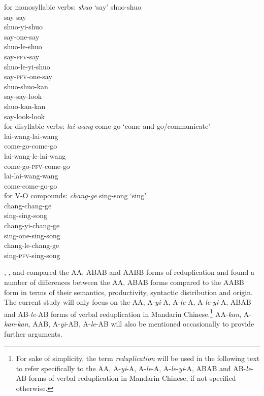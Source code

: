\documentclass[11pt,a4paper,fleqn,draft]{article}
\begin{document}
\ea\label{ex:redup-forms}
	\ea for monosyllabic verbs: \emph{shuo} `say'
		\ea \gll shuo-shuo\\
		say-say\\
		\ex \gll shuo-yi-shuo\\
		say-one-say\\
		\ex \gll shuo-le-shuo\\
		say-\textsc{pfv}-say\\
		\ex \gll shuo-le-yi-shuo\\
		say-\textsc{pfv}-one-say\\
		\ex \gll shuo-shuo-kan\\
		say-say-look\\
		\ex \gll shuo-kan-kan\\
		 say-look-look\\
		\z
	\ex for disyllabic verbs: \emph{lai-wang} come-go `come and go/communicate'\\
		\ea \gll lai-wang-lai-wang\\
		come-go-come-go\\ 
		\ex \gll lai-wang-le-lai-wang\\
		come-go-\textsc{pfv}-come-go\\ 
		\ex \gll lai-lai-wang-wang\\
		come-come-go-go\\ 
		\z
	\ex\label{ex:forms-VO} for V-O compounds: \emph{chang-ge} sing-song `sing'\\
		\ea \gll chang-chang-ge\\
		sing-sing-song\\ 
		\ex \gll chang-yi-chang-ge\\
		sing-one-sing-song\\ 
		\ex \gll chang-le-chang-ge\\
		sing-\textsc{pfv}-sing-song\\ 
		\z
	\z
\z



\citet{Arcodiaetal2014}, \citet{Fan1964}, \citet{MelloniBasciano2018} and \citet{Xie2020} compared the AA, ABAB and AABB forms of reduplication 
and found a number of differences between the AA, ABAB forms compared to the AABB form in terms of their semantics, productivity, syntactic distribution and origin. 
The current study will only focus on the AA, A-\emph{yi}-A, A-\emph{le}-A, A-\emph{le}-\emph{yi}-A, ABAB and AB-\emph{le}-AB forms of verbal reduplication in Mandarin Chinese.\footnote{For sake of simplicity, 
the term \emph{reduplication} will be used in the following text to refer specifically to the AA, A-\emph{yi}-A, A-\emph{le}-A, A-\emph{le}-\emph{yi}-A, ABAB and AB-\emph{le}-AB forms of verbal reduplication in Mandarin Chinese, if not specified otherwise.}
AA-\emph{kan}, A-\emph{kan}-\emph{kan}, AAB, A-\emph{yi}-AB, A-\emph{le}-AB will also be mentioned occasionally to provide further arguments.
\end{document}
